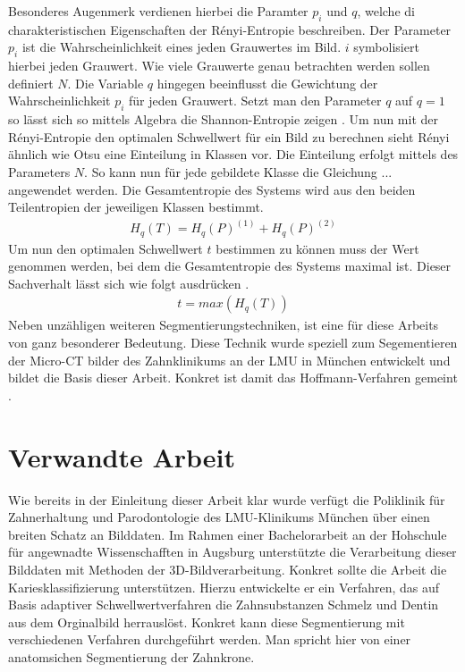 Besonderes Augenmerk verdienen hierbei die Paramter $p_{i}$ und $q$, welche di
charakteristischen Eigenschaften der Rényi-Entropie beschreiben. Der Parameter $p
_{i}$ ist die Wahrscheinlichkeit eines jeden Grauwertes im Bild. $i$
symbolisiert hierbei jeden Grauwert. Wie viele Grauwerte genau betrachten werden
sollen definiert $N$. Die Variable $q$ hingegen beeinflusst die Gewichtung der
Wahrscheinlichkeit $p_{i}$ für jeden Grauwert. Setzt man den Parameter $q$ auf $q
= 1$ so lässt sich so mittels Algebra die Shannon-Entropie zeigen \citep[vgl.][K.2]{bromiley2004}.
Um nun mit der Rényi-Entropie den optimalen Schwellwert für ein Bild zu berechnen
sieht Rényi ähnlich wie Otsu eine Einteilung in Klassen vor. Die Einteilung
erfolgt mittels des Parameters $N$. So kann nun für jede gebildete Klasse die Gleichung
... angewendet werden. Die Gesamtentropie des Systems wird aus den beiden
Teilentropien der jeweiligen Klassen bestimmt\citep[vgl.][K. 2]{bromiley2004}.
\begin{align}
	H_{q}(T) = H_{q}(P)^{(1)}+ H_{q}(P)^{(2)}
\end{align}
Um nun den optimalen Schwellwert $t$ bestimmen zu können muss der Wert genommen werden,
bei dem die Gesamtentropie des Systems maximal ist. Dieser Sachverhalt lässt sich
wie folgt ausdrücken \citep[vgl.][K. 2]{bromiley2004}.
\begin{align}
	t = max(H_{q}(T))
\end{align}
Neben unzähligen weiteren Segmentierungstechniken, ist eine für diese Arbeits
von ganz besonderer Bedeutung. Diese Technik wurde speziell zum Segementieren der
Micro-CT bilder des Zahnklinikums an der LMU in München entwickelt und bildet die
Basis dieser Arbeit. Konkret ist damit das Hoffmann-Verfahren gemeint \citep[vgl.][]{hoffmann2020}.

\pagebreak

\section{Verwandte Arbeit}
\label{sec:verwwandte_arbeit} Wie bereits in der Einleitung dieser Arbeit klar
wurde verfügt die Poliklinik für Zahnerhaltung und Parodontologie des LMU-Klinikums
München über einen breiten Schatz an Bilddaten. Im Rahmen einer Bachelorarbeit an
der Hohschule für angewnadte Wissenschafften in Augsburg unterstützte \citet{hoffmann2020}
die Verarbeitung dieser Bilddaten mit Methoden der 3D-Bildverarbeitung. Konkret sollte
die Arbeit die Kariesklassifizierung unterstützen. Hierzu entwickelte er ein
Verfahren, das auf Basis adaptiver Schwellwertverfahren die Zahnsubstanzen Schmelz
und Dentin aus dem Orginalbild herrauslöst. Konkret kann diese Segmentierung mit
verschiedenen Verfahren durchgeführt werden. Man spricht hier von einer anatomsichen
Segmentierung der Zahnkrone.

